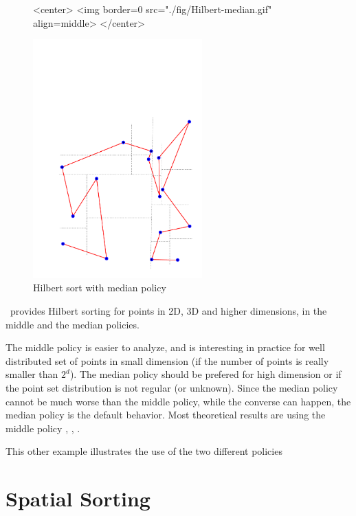 \begin{figure}[t]
\begin{ccHtmlOnly}
<center>
<img border=0 src="./fig/Hilbert-median.gif" align=middle>
</center>
\end{ccHtmlOnly} 
\begin{ccTexOnly}
\begin{center}
\includegraphics[width=6.5cm]{Spatial_sorting/fig/Hilbert-median}
\end{center}
\end{ccTexOnly}
\caption{Hilbert sort with median policy
\label{Spatial_sorting_fig_Hilbert_median}}
\end{figure}


\cgal\ provides Hilbert sorting for points in 2D, 3D and higher dimensions,
in the middle and the median policies.

The middle policy is easier to analyze, and is interesting in practice
for well distributed set of points in small dimension (if the number
of points is really smaller than $2^d$).
The median policy should be prefered for high dimension or if 
the point set distribution is not regular (or unknown).
Since the median policy cannot be much worse than the middle
policy, while the converse can happen, the median policy is the
default behavior.
Most theoretical results are using the middle policy
\cite{acr-icb-03}, \cite{b-aahsf-71}, \cite{bg-sfche-89,pb-scpts-89}.


This other example illustrates the use of the two different policies




\section{Spatial Sorting\label{sec:spatial_sorting}}

